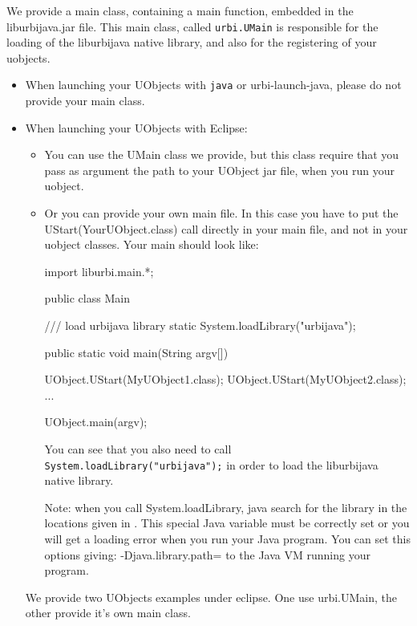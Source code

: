 We provide a main class, containing a main function, embedded in the liburbijava.jar file. This main class,
called \lstinline{urbi.UMain} is responsible for the loading of the liburbijava native library, and also
for the registering of your uobjects.

\begin{itemize}

\item When launching your UObjects with \lstinline{java} or urbi-launch-java, please do not provide your main class.

\item When launching your UObjects with Eclipse:
\begin{itemize}
\item You can use the UMain class we provide, but this class require that you pass as argument the path to your UObject jar file, when you run your uobject.
\item Or you can provide your own main file. In this case you have to put the UStart(YourUObject.class) call directly in your main file, and not in your
uobject classes. Your main should look like:

\begin{cxx}
import liburbi.main.*;

public class Main {

    /// load urbijava library
    static {
        System.loadLibrary("urbijava");
    }

    public static void main(String argv[]) {
      UObject.UStart(MyUObject1.class);
      UObject.UStart(MyUObject2.class);
      ...

      UObject.main(argv);
    }
}
\end{cxx}

You can see that you also need to call \lstinline{System.loadLibrary("urbijava");} in order to load the liburbijava native library.

Note: when you call System.loadLibrary, java search for the library in the locations given
in . This special Java variable must be correctly set or you
will get a loading error when you run your Java program.
You can set this options giving: -Djava.library.path=
to the Java VM running your program.


\end{itemize}

We provide two UObjects examples under eclipse. One use urbi.UMain, the other provide it's own main class.
\end{itemize}


